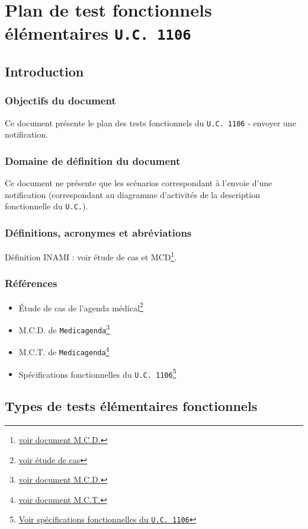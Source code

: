 \chapter{Plan de test fonctionnels élémentaires \texttt{U.C. 1106}}
\section{Introduction}
\subsection{Objectifs du document}
Ce document présente le plan des tests fonctionnels du \texttt{U.C. 1106} -
envoyer une notification. 
\subsection{Domaine de définition du document}
Ce document ne présente que les scénarios correspondant à l'envoie d’une
notification (correspondant au diagramme d’activités de la description 
fonctionnelle du \texttt{U.C.}).
\subsection{Définitions, acronymes et abréviations}
Définition INAMI : voir étude de cas et MCD\footnote{\href{../MCD/MCD.pdf}{voir document M.C.D.}}.
\subsection{Références}
\begin{itemize}
	\item[] Étude de cas de l'agenda
		médical\footnote{\href{../Enonce_Travail_Synthese_14-15.pdf}{voir
		étude de cas}}
	\item[] M.C.D. de \texttt{Medicagenda}\footnote{\href{../MCD/MCD.pdf}{voir document M.C.D.}}
	\item[] M.C.T. de \texttt{Medicagenda}\footnote{\href{./MCT.pdf}{voir document M.C.T.}}
	\item[] Spécifications fonctionnelles du \texttt{U.C.
		1106}\footnote{\href{./specifications_fonctionnelles_UC_1106_envoyer_une_notification.pdf}{Voir
			spécifications fonctionnelles du \texttt{U.C. 1106}}}
	\end{itemize}

	\section{Types de tests élémentaires fonctionnels}
